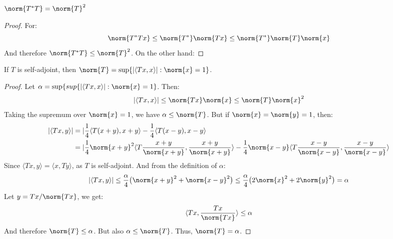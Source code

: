             \begin{theorem}
                $\norm{T^{*}T}=\norm{T}^{2}$
            \end{theorem}
            \begin{proof}
                For:
                \begin{equation*}
                    \norm{T^{*}Tx}\leq\norm{T^{*}}
                    \norm{Tx}\leq
                    \norm{T^{*}}\norm{T}\norm{x}
                \end{equation*}
                And therefore $\norm{T^{*}T}\leq\norm{T}^{2}$.
                On the other hand:
            \end{proof}
            \begin{theorem}
                If $T$ is self-adjoint, then
                $\norm{T}=\sup\{|\langle{Tx,x}\rangle|:\norm{x}=1\}$.
            \end{theorem}
            \begin{proof}
                \label{thm:Funct:Norm_of_Self_%
                       Adjoint_Operator}
                Let
                $\alpha=\sup\{sup\{|\langle{Tx,x}\rangle|:\norm{x}=1\}$.
                Then:
                \begin{equation*}
                    |\langle{Tx,x}\rangle|
                    \leq\norm{Tx}\norm{x}\leq
                    \norm{T}\norm{x}^{2}
                \end{equation*}
                Taking the supremum over $\norm{x}=1$,
                we have $\alpha\leq\norm{T}$.
                But if $\norm{x}=\norm{y}=1$, then:
                \begin{align*}
                    |\langle{Tx,y}\rangle|
                    &=|\frac{1}{4}\langle{T(x+y),x+y}\rangle
                    -\frac{1}{4}\langle{T(x-y),x-y}\rangle\\
                    &=|\frac{1}{4}\norm{x+y}^{2}
                    \langle{T}\frac{x+y}{\norm{x+y}},
                           \frac{x+y}{\norm{x+y}}\rangle
                    -\frac{1}{4}\norm{x-y}
                    \langle{T}\frac{x-y}{\norm{x-y}},
                           \frac{x-y}{\norm{x-y}}\rangle
                \end{align*}
                Since
                $\langle{Tx,y}\rangle=\langle{x,Ty}\rangle$,
                as $T$ is self-adjoint.
                And from the definition of $\alpha$:
                \begin{equation*}
                    |\langle{Tx,y}\rangle|
                    \leq\frac{\alpha}{4}
                    \big(\norm{x+y}^{2}+\norm{x-y}^{2}\big)
                    \leq\frac{\alpha}{4}
                    \big(2\norm{x}^{2}+2\norm{y}^{2}\big)
                    =\alpha
                \end{equation*}
                Let $y=Tx/\norm{Tx}$, we get:
                \begin{equation*}
                    \langle{Tx,\frac{Tx}{\norm{Tx}}}\rangle
                    \leq\alpha
                \end{equation*}
                And therefore $\norm{T}\leq\alpha$. But also
                $\alpha\leq\norm{T}$. Thus, $\norm{T}=\alpha$.
            \end{proof}
